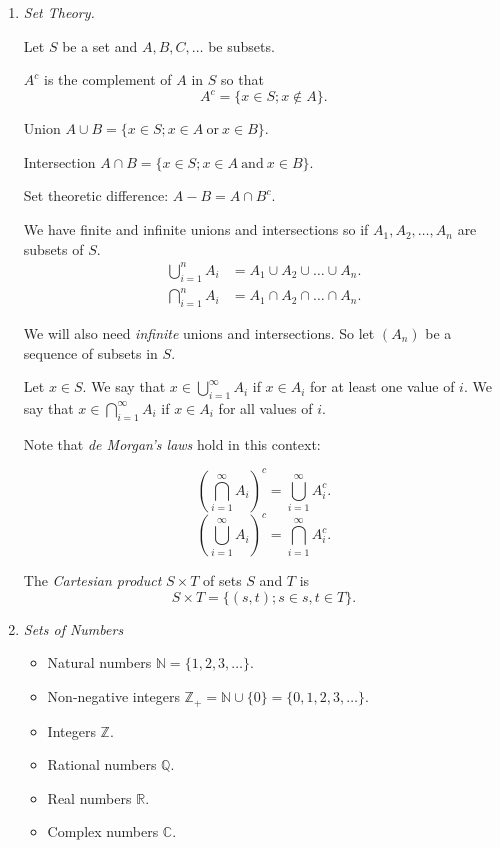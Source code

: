 \documentclass[a4paper]{report}
\numberwithin{equation}{chapter}
\numberwithin{thm_counter}{section}
\def\mb{\mathbb} %
\def\R{\mb{R}} %
\def\C{\mb{C}} %
\def\N{\mb{N}}
\def\Z{\mb{Z}}
\begin{document}
\begin{enumerate}

\item{\it Set Theory.}

Let $S$ be a set and $A,B,C, \ldots$ be subsets.

$A^{c}$ is the complement of $A$ in $S$ so that
$$ A^{c} = \{x \in S; x \notin A\}.$$

Union $A \cup B = \{x \in  S; x \in A~\mbox{or}~x \in B\}$.

Intersection $A \cap B = \{x \in  S; x \in A~\mbox{and}~x \in B\}$.

Set theoretic difference: $A - B = A \cap B^{c}$.

We have finite and infinite unions and intersections so if $A_{1}, A_{2}, \ldots, A_{n}$ are subsets of $S$.
$$\begin{aligned}
\bigcup_{i=1}^{n} A_{i} &= A_{1} \cup A_{2} \cup \ldots \cup A_{n}.\\
\bigcap_{i=1}^{n} A_{i} &= A_{1} \cap A_{2} \cap \ldots \cap A_{n}.
\end{aligned}$$

We will also need {\it infinite} unions and intersections. So let $(A_{n})$ be a sequence of subsets in $S$.

Let $x \in S$. We say that $x \in \bigcup_{i=1}^{\infty} A_{i}$ if $x \in A_{i}$ for at least one value of $i$.
We say that $x \in \bigcap_{i=1}^{\infty} A_{i}$ if $x \in A_{i}$ for all values of $i$.

Note that {\it de Morgan's laws} hold in this context:

$$ \left(\bigcap_{i=1}^{\infty} A_{i}\right)^{c} = \bigcup_{i=1}^{\infty} A_{i}^{c}.$$
$$ \left(\bigcup_{i=1}^{\infty} A_{i}\right)^{c} = \bigcap_{i=1}^{\infty} A_{i}^{c}.$$

The {\it Cartesian product} $S \times T$ of sets $S$ and $T$ is
$$ S \times T = \{(s,t); s \in s, t \in T\}.$$


\item{\it Sets of Numbers}

\begin{itemize}

\item Natural numbers $\N = \{1, 2,3, \ldots \}$.
\item Non-negative integers $\Z_{+} = \N \cup\{0\} = \{0,1, 2,3, \ldots \}$.
\item Integers $\Z$.
\item Rational numbers $\mathbb{Q}$.
\item Real numbers $\R$.
\item Complex numbers $\C$.
\end{itemize}


\end{enumerate}
\end{document}
